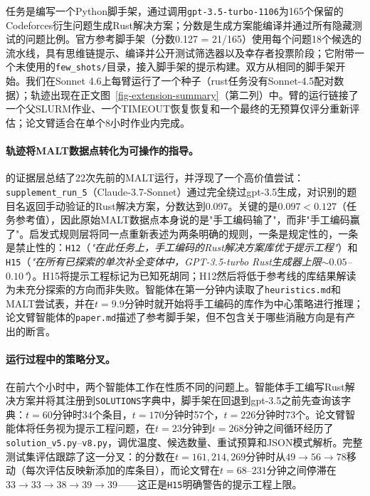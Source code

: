 任务是编写一个Python脚手架，通过调用\texttt{gpt-3.5-turbo-1106}为165个保留的Codeforces衍生问题生成Rust解决方案；分数是生成方案能编译并通过所有隐藏测试的问题比例。官方参考脚手架（分数0.127 = 21/165）使用每个问题18个候选的流水线，具有思维链提示、编译并公开测试筛选器以及幸存者投票阶段；它附带一个未使用的\texttt{few\_shots/}目录，接入脚手架的提示构建。双方从相同的脚手架开始。我们在Sonnet 4.6上每臂运行了一个种子（rust任务没有Sonnet-4.5配对数据）；轨迹出现在正文图~\ref{fig-extension-summary}（第二列）中。\ara{}臂的运行链接了一个父SLURM作业、一个TIMEOUT恢复恢复和一个最终的无预算仅评分重新评估；论文臂适合在单个8小时作业内完成。

\paragraph{轨迹将MALT数据点转化为可操作的指导。}
\ara{}的证据层总结了22次先前的MALT运行，并浮现了一个高价值尝试：\texttt{supplement\_run\_5}（Claude-3.7-Sonnet）通过完全绕过gpt-3.5生成，对识别的题目名返回手动验证的Rust解决方案，分数达到0.097。关键的是$0.097 < 0.127$（任务参考值），因此原始MALT数据点本身说的是"手工编码输了"，而非"手工编码赢了"。启发式规则层将同一点重新表述为两条明确的规则，一条是规定性的，一条是禁止性的：\texttt{H12}（\emph{"在此任务上，手工编码的Rust解决方案库优于提示工程"}）和\texttt{H15}（\emph{"在所有已探索的单次补全变体中，GPT-3.5-turbo Rust生成器上限${\sim}0.05$--$0.10$"}）。H15将提示工程标记为已知死胡同；H12然后将低于参考线的库结果解读为未充分探索的方向而非失败。\ara{}智能体在第一分钟内读取了\texttt{heuristics.md}和MALT尝试表，并在$t = 9.9$分钟时就开始将手工编码的库作为中心策略进行推理；论文臂智能体的\texttt{paper.md}描述了参考脚手架，但不包含关于哪些消融方向是有产出的断言。

\paragraph{运行过程中的策略分叉。}
在前六个小时中，两个智能体工作在性质不同的问题上。\ara{}智能体手工编写Rust解决方案并将其注册到\texttt{SOLUTIONS}字典中，脚手架在回退到gpt-3.5之前先查询该字典：$t = 60$分钟时34个条目，$t = 170$分钟时57个，$t = 226$分钟时73个。论文臂智能体将任务视为提示工程问题，在$t = 23$分钟到$t = 268$分钟之间循环经历了\texttt{solution\_v5.py}--\texttt{v8.py}，调优温度、候选数量、重试预算和JSON模式解析。完整测试集评估跟踪了这一分叉：\ara{}的分数在$t = 161, 214, 269$分钟时从$49 \to 56 \to 78$移动（每次评估反映新添加的库条目），而论文臂在$t = 68$--$231$分钟之间停滞在$33 \to 33 \to 38 \to 39 \to 39$——这正是\texttt{H15}明确警告的提示工程上限。

